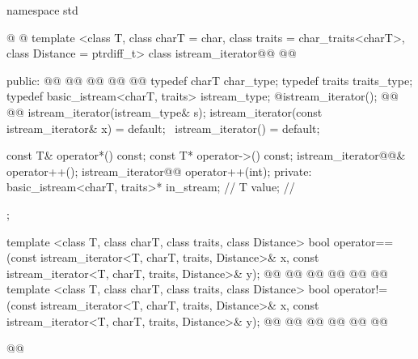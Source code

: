 \begin{codeblock}
namespace std { @ @
  template <class T, class charT = char, class traits = char_traits<charT>,
      class Distance = ptrdiff_t>
  class istream_iterator@\removed{:}@
    @@ {
  public:
    @@
    @@
    @@
    @@
    @@
    typedef charT char_type;
    typedef traits traits_type;
    typedef basic_istream<charT, traits> istream_type;
    @\seebelow@ istream_iterator();
    @\newtxt{\seebelow}@ @@
    istream_iterator(istream_type& s);
    istream_iterator(const istream_iterator& x) = default;
   ~istream_iterator() = default;

    const T& operator*() const;
    const T* operator->() const;
    istream_iterator@@& operator++();
    istream_iterator@@  operator++(int);
  private:
    basic_istream<charT, traits>* in_stream; // \expos
    T value;                                 // \expos
  };

  template <class T, class charT, class traits, class Distance>
    bool operator==(const istream_iterator<T, charT, traits, Distance>& x,
            const istream_iterator<T, charT, traits, Distance>& y);
  @@
    @@
            @@
  @@
    @@
            @@
  template <class T, class charT, class traits, class Distance>
    bool operator!=(const istream_iterator<T, charT, traits, Distance>& x,
            const istream_iterator<T, charT, traits, Distance>& y);
  @@
    @@
            @@
  @@
    @@
            @@
}@\added{\}\}}\newtxt{\}}@
\end{codeblock}

